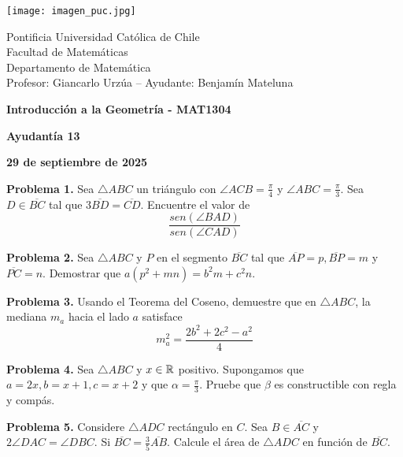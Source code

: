 \documentclass{article}
\begin{document}
\begin{minipage}{2.5cm}
    \texttt{[image: imagen\_puc.jpg]}
\end{minipage}
\begin{minipage}{14cm}
    {\sc Pontificia Universidad Católica de Chile\\
    Facultad de Matemáticas\\
    Departamento de Matemática\\
    Profesor: Giancarlo Urzúa -- Ayudante: Benjamín Mateluna}
\end{minipage}
\vspace{1ex}

{\centerline{\bf Introducción a la Geometría - MAT1304}
\centerline{\bf Ayudantía 13}}
\centerline{\bf 29 de septiembre de 2025}

\vspace{1cm}
\noindent\textbf{Problema 1.} Sea $\triangle ABC$ un triángulo con $\angle ACB=\frac{\pi}{4}$ y
$\angle ABC=\frac{\pi}{3}$. Sea $D\in\overline{BC}$ tal que $3\overline{BD}=\overline{CD}$. 
Encuentre el valor de
\begin{equation*}
    \frac{sen(\angle BAD)}{sen(\angle CAD)}
\end{equation*}

\vspace{5mm}
\noindent\textbf{Problema 2.} Sea $\triangle ABC$ y $P$ en el segmento $\overline{BC}$ tal que
$\overline{AP}=p, \overline{BP}=m$ y $\overline{PC}=n$. Demostrar que $a(p^{2}+mn)=b^{2}m+c^{2}n$.

\vspace{5mm}
\noindent\textbf{Problema 3.} Usando el Teorema del Coseno, demuestre que en $\triangle ABC$,
la mediana $m_{a}$ hacia el lado $a$ satisface
\begin{equation*}
    m_{a}^{2}=\frac{2b^{2}+2c^{2}-a^{2}}{4}
\end{equation*}

\vspace{5mm}
\noindent\textbf{Problema 4.} Sea $\triangle ABC$ y $x\in\mathbb{R}$ positivo. Supongamos que 
$a=2x,b=x+1,c=x+2$ y que $\alpha=\frac{\pi}{3}$. Pruebe que $\beta$ es constructible con regla y 
compás.

\vspace{5mm}
\noindent\textbf{Problema 5.} Considere $\triangle ADC$ rectángulo en $C$. Sea $B\in\overline{AC}$
y $2\angle DAC=\angle DBC$. Si $\overline{BC}=\frac{3}{5}\overline{AB}$. Calcule el área de 
$\triangle ADC$ en función de $\overline{BC}$.

\end{document}
